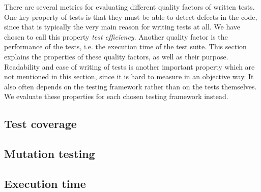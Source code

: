 
There are several metrics for evaluating different quality factors of
written tests. One key property of tests is that they must be able to
detect defects in the code, since that is typically the very main reason
for writing tests at all. We have chosen to call this property
\emph{test efficiency}. Another quality factor is the performance of the
tests, i.e. the execution time of the test suite. This section explains
the properties of these quality factors, as well as their purpose.\\

Readability and ease of writing of tests is another important property
which are not mentioned in this section, since it is hard to measure in
an objective way. It also often depends on the testing framework rather
than on the tests themselves. We evaluate these properties for each
chosen testing framework instead.\\

\subsection{Test coverage}
\label{sec:coverage}


\subsection{Mutation testing}
\label{sec:theory_mutation}


\subsection{Execution time}

